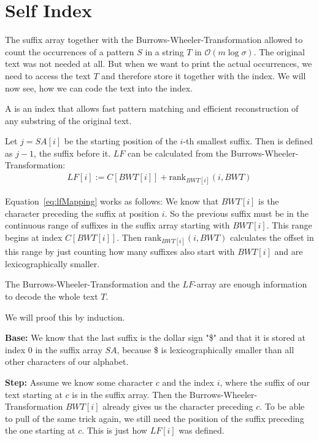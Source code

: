 \section{Self Index}

The suffix array together with the Burrows-Wheeler-Transformation allowed to count the occurrences of a pattern $S$ in a string $T$ in $\mathcal{O}(m\log\sigma)$. The original text was not needed at all. But when we want to print the actual occurrences, we need to access the text $T$ and therefore store it together with the index. We will now see, how we can code the text into the index.

\begin{Definition}
  A  is an index that allows fast pattern matching and efficient reconstruction of any substring of the original text.
\end{Definition}

\begin{Definition}
  Let $j = SA[i]$ be the starting position of the $i$-th smallest suffix. Then  is defined as $j-1$, the suffix before it. $LF$ can be calculated from the Burrows-Wheeler-Transformation:
  \begin{align}
    LF[i] := C[BWT[i]] + \mathrm{rank}_{BWT[i]}(i, BWT)
    \label{eq:lfMapping}
  \end{align}
\end{Definition}

Equation~\ref{eq:lfMapping} works as follows: We know that $BWT[i]$ is the character preceding the suffix at position $i$. So the previous suffix must be in the continuous range of suffixes in the suffix array starting with $BWT[i]$. This range begins at index $C[BWT[i]]$. Then $\mathrm{rank}_{BWT[i]}(i, BWT)$ calculates the offset in this range by just counting how many suffixes also start with $BWT[i]$ and are lexicographically smaller.

\begin{Theorem}
  The Burrows-Wheeler-Transformation and the $LF$-array are enough information to decode the whole text $T$.
\end{Theorem}

\begin{Proof}
  We will proof this by induction.

  \textbf{Base:} We know that the last suffix is the dollar sign "\$" and that it is stored at index $0$ in the suffix array $SA$, because \$ is lexicographically smaller than all other characters of our alphabet.

  \textbf{Step:} Assume we know some character $c$ and the index $i$, where the suffix of our text starting at $c$ is in the suffix array. Then the Burrows-Wheeler-Transformation $BWT[i]$ already gives us the character preceding $c$. To be able to pull of the same trick again, we still need the position of the suffix preceding the one starting at $c$. This is just how $LF[i]$ was defined.
\end{Proof}

